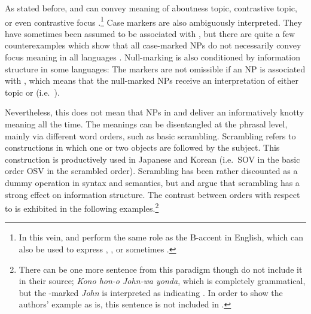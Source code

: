 \noindent As stated before, \wa and \nun can convey meaning of
aboutness topic, contrastive topic, or even contrastive
focus \citep{choi:99,song:bender:11}.\footnote{In this vein, 
\wa and \nun perform the same role as the
  B-accent in English, which can also be used to express
  , ,
  or sometimes  \citep{hedberg:06}.}  Case
markers are also ambiguously interpreted.  They have sometimes been
assumed to be associated with , but there are quite a few
counterexamples which show that all case-marked NPs do not necessarily
convey focus meaning in all languages \citep{heycock:94}. Null-marking
is also conditioned by information structure in some languages: The
markers are not omissible if an NP is associated with ,
which means that the null-marked NPs receive an interpretation of
either topic or  (i.e.\ ).


Nevertheless, this does not mean that NPs in  and
 deliver an informatively knotty meaning all the time. The
meanings can be disentangled at the phrasal level, mainly via
different word orders, such as basic \vs scrambling.
Scrambling refers to constructions in which one or two objects are
followed by the subject. This construction is productively used in
Japanese and Korean (i.e.\ SOV in the basic order \vs OSV in the
scrambled order). Scrambling has been rather discounted as a dummy
operation in syntax and semantics, but \citet{choi:99} and
\citet{ishihara:01} argue that scrambling has a strong effect on
information structure.  The contrast between orders with respect to
\wa is exhibited in the following examples.\footnote{There can be one
  more sentence from this paradigm though \citet{maki:etal:99} do not
  include it in their source; \textit{Kono hon-o John-wa yonda}, which
  is completely grammatical, but the \wa-marked \textit{John} is
  interpreted as indicating . In order to show the
  authors' example as is, this sentence is not included in
  .}





